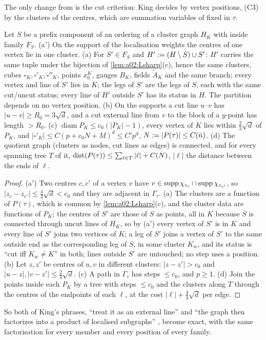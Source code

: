 The only change from \cite[p.~666]{K1} is the cut criterion: King decides by vertex positions, (C3) by the clusters of the centres, which are summation variables of \cite[(3.36)]{K1} fixed in $\tau$.

\begin{lemma}\label{lem:a02:CL}
Let $S$ be a prefix component of an ordering of a cluster graph $H_K$ with inside family $F_S$. \textup{(a$'$)} On the support of the localisation weights the centres of one vertex lie in one cluster. \textup{(a)} For $S'\in F_S$ and $H':=(H\setminus S)\cup S'$: $H'$ carries the same tuple under the bijection of \cref{lem:a02:Lsharp}(c), hence the same clusters, cubes $\square_K,\square'_K,\square''_K$, points $x_0^K$, gauges $B_K$, fields $\tilde A_K$ and the same branch; every vertex and line of $S'$ lies in $K$; the legs of $S'$ are the legs of $S$, each with the same cut/uncut status; every line of $H'$ outside $S'$ has its status in $H$. The partition depends on no vertex position. \textup{(b)} On the supports a cut line $u$--$v$ has $|u-v|\ge R_0=3\sqrt d$, and a cut external line from $v$ to the block of a $y$-point has length $>R_0$. \textup{(c)} $\operatorname{diam}P_K\le c_0(|P_K|-1)$, every vertex of $K$ lies within $\frac23\sqrt d$ of $P_K$, and $|\square'_K|\le C(p+c_0N+M)^d\le C'p^d$, $N:=|P(\tau)|\le C(\bar n)$. \textup{(d)} The quotient graph (clusters as nodes, cut lines as edges) is connected, and for every spanning tree $T$ of it, $\operatorname{dist}(P(\tau))\le\sum_{\ell\in T}|\ell|+C(N)$, $|\ell|$ the distance between the ends of $\ell$.
\end{lemma}
\begin{proof}
(a$'$) Two centres $c,c'$ of a vertex $v$ have $v\in\operatorname{supp}\chi_{z_c}\cap\operatorname{supp}\chi_{z_{c'}}$, so $|z_c-z_{c'}|\le\frac43\sqrt d<c_0$ and they are adjacent in $\Gamma_\tau$. (a) The clusters are a function of $P(\tau)$, which is common by \cref{lem:a02:Lsharp}(c), and the cluster data are functions of $P_K$; the centres of $S'$ are those of $S$ as points, all in $K$ because $S$ is connected through uncut lines of $H_K$, so by (a$'$) every vertex of $S'$ is in $K$ and every line of $S'$ joins two vertices of $K$; a leg of $S'$ joins a vertex of $S'$ to the same outside end as the corresponding leg of $S$, in some cluster $K_w$, and its status is ``cut iff $K_w\ne K$'' in both; lines outside $S'$ are untouched; no step uses a position. (b) Let $z,z'$ be centres of $u,v$ in different clusters: $|z-z'|>c_0$ and $|u-z|,|v-z'|\le\frac23\sqrt d$. (c) A path in $\Gamma_\tau$ has steps $\le c_0$, and $p\ge1$. (d) Join the points inside each $P_K$ by a tree with steps $\le c_0$ and the clusters along $T$ through the centres of the endpoints of each $\ell$, at the cost $|\ell|+\frac43\sqrt d$ per edge.
\end{proof}
So both of King's phrases, ``treat it as an external line'' and ``the graph then factorizes into a product of localised subgraphs'' \cite[p.~666]{K1}, become exact, with the same factorisation for every member and every position of every family.

